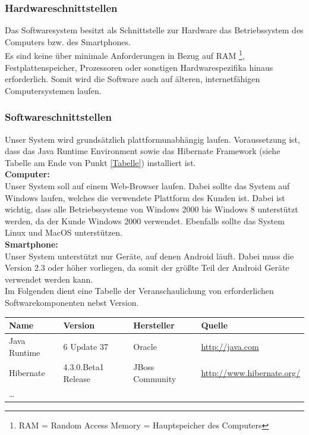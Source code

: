\documentclass[fontsize=12pt,paper=a4,twoside]{scrartcl}
\begin{document}
\subsubsection{Hardwareschnittstellen} \label{hardware}
Das Softwaresystem besitzt als Schnittstelle zur Hardware das Betriebssystem des Computers bzw. des 
Smartphones. \\
  Es sind keine über minimale Anforderungen in Bezug auf RAM
  \footnote{RAM = Random Access Memory = Hauptspeicher des Computers}, Festplattenspeicher, 
  Prozessoren oder sonstigen Hardwarespezifika hinaus erforderlich. Somit wird die Software auch auf 
  älteren, internetfähigen Computersystemen laufen. \\
 
\subsubsection{Softwareschnittstellen} \label{software}

Unser System wird grundsätzlich plattformunabhängig laufen. Voraussetzung ist, dass das Java Runtime 
Environment sowie das Hibernate Framework (siehe Tabelle am Ende von Punkt \ref{Tabelle}) installiert 
ist. \\

   \textbf{Computer:}\\
  Unser System soll auf einem Web-Browser laufen. Dabei sollte das System auf Windows laufen, welches 
  die verwendete Plattform des Kunden ist. Dabei ist wichtig, dass alle Betriebssysteme von Windows 
  2000 bis Windows 8 unterstützt werden, da der Kunde Windows 2000 verwendet. Ebenfalls sollte das 
  System Linux und MacOS unterstützen. \\
  
  \textbf{Smartphone:}\\
  Unser System unterstützt nur Geräte, auf denen Android läuft. Dabei muss  die Version 2.3 oder höher 
  vorliegen, da somit der größte Teil der Android Geräte verwendet werden kann.\\
Im Folgenden dient eine Tabelle der Veranschaulichung von erforderlichen Softwarekomponenten nebst 
Version.  \\ 

\label{Tabelle}
  \begin{tabular}{|l|l|l|l|}\hline
    \textbf{Name} & \textbf{Version} & \textbf{Hersteller} & \textbf{Quelle} \\\hline
    Java Runtime & 6 Update 37 & Oracle & \url{http://java.com} \\\hline
    Hibernate & 4.3.0.Beta1 Release& JBoss Community &  
   \url{http://www.hibernate.org/}\\\hline
    \ldots & & & \\\hline
  \end{tabular}
\end{document}
